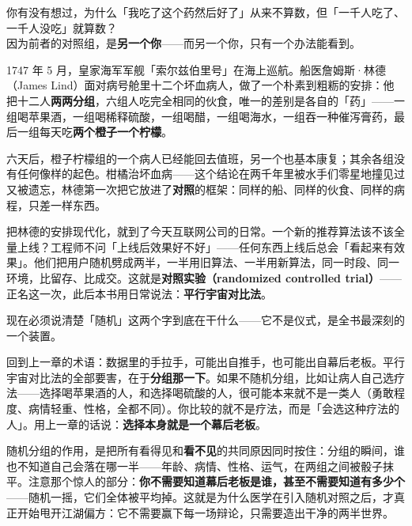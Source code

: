 \documentclass[../../main2.tex]{subfiles}
\begin{document}
	\begin{readingnote}
		你有没有想过，为什么「我吃了这个药然后好了」从来不算数，但「一千人吃了、一千人没吃」就算数？\\
		因为前者的对照组，是\textbf{另一个你}——而另一个你，只有一个办法能看到。
	\end{readingnote}

	1747 年 5 月，皇家海军军舰「索尔兹伯里号」在海上巡航。船医詹姆斯·林德（James Lind）面对病号舱里十二个坏血病人，做了一个朴素到粗粝的安排：他把十二人\textbf{两两分组}，六组人吃完全相同的伙食，唯一的差别是各自的「药」——一组喝苹果酒，一组喝稀释硫酸，一组喝醋，一组喝海水，一组吞一种催泻膏药，最后一组每天吃\textbf{两个橙子一个柠檬}。

	六天后，橙子柠檬组的一个病人已经能回去值班，另一个也基本康复；其余各组没有任何像样的起色。柑橘治坏血病——这个结论在两千年里被水手们零星地撞见过又被遗忘，林德第一次把它放进了\textbf{对照}的框架：同样的船、同样的伙食、同样的病程，只差一样东西。


	把林德的安排现代化，就到了今天互联网公司的日常。一个新的推荐算法该不该全量上线？工程师不问「上线后效果好不好」——任何东西上线后总会「看起来有效果」。他们把用户随机劈成两半，一半用旧算法、一半用新算法，同一时段、同一环境，比留存、比成交。这就是\textbf{对照实验（randomized controlled trial）}——正名这一次，此后本书用日常说法：\textbf{平行宇宙对比法}。

	现在必须说清楚「随机」这两个字到底在干什么——它不是仪式，是全书最深刻的一个装置。

	回到上一章的术语：数据里的手拉手，可能出自推手，也可能出自幕后老板。平行宇宙对比法的全部要害，在于\textbf{分组那一下}。如果不随机分组，比如让病人自己选疗法——选择喝苹果酒的人，和选择喝硫酸的人，很可能本来就不是一类人（勇敢程度、病情轻重、性格，全都不同）。你比较的就不是疗法，而是「会选这种疗法的人」。用上一章的话说：\textbf{选择本身就是一个幕后老板}。

	随机分组的作用，是把所有看得见和\textbf{看不见}的共同原因同时按住：分组的瞬间，谁也不知道自己会落在哪一半——年龄、病情、性格、运气，在两组之间被骰子抹平。注意那个惊人的部分：\textbf{你不需要知道幕后老板是谁，甚至不需要知道有多少个}——随机一摇，它们全体被平均掉。这就是为什么医学在引入随机对照之后，才真正开始甩开江湖偏方：它不需要赢下每一场辩论，只需要造出干净的两半世界。
\end{document}
